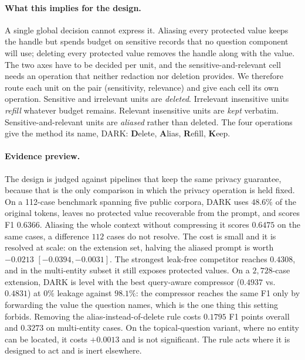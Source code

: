 \paragraph{What this implies for the design.}
A single global decision cannot express it. Aliasing every protected value keeps the handle
but spends budget on sensitive records that no question component will use; deleting every
protected value removes the handle along with the value. The two axes have to be decided per
unit, and the sensitive-and-relevant cell needs an operation that neither redaction nor
deletion provides. We therefore route each unit on the pair (sensitivity, relevance) and give
each cell its own operation. Sensitive and irrelevant units are \emph{deleted}. Irrelevant
insensitive units \emph{refill} whatever budget remains. Relevant insensitive units are
\emph{kept} verbatim. Sensitive-and-relevant units are \emph{aliased} rather than deleted.
The four operations give the method its name, \textsc{DARK}: \textbf{D}elete,
\textbf{A}lias, \textbf{R}efill, \textbf{K}eep.

\paragraph{Evidence preview.}
The design is judged against pipelines that keep the same privacy guarantee, because that is
the only comparison in which the privacy operation is held fixed. On a 112-case benchmark
spanning five public corpora, \textsc{DARK} uses $48.6\%$ of the original tokens, leaves no
protected value recoverable from the prompt, and scores F1 $0.6366$. Aliasing the whole
context without compressing it scores $0.6475$ on the same cases, a difference $112$ cases do not
resolve. The cost is small and it is resolved at scale: on the extension set, halving the aliased
prompt is worth $-0.0213$ $[-0.0394,-0.0031]$. The
strongest leak-free competitor reaches $0.4308$, and in the multi-entity subset it still
exposes protected values. On a $2{,}728$-case extension, \textsc{DARK} is level with the best
query-aware compressor ($0.4937$ vs.\ $0.4831$) at $0\%$ leakage against $98.1\%$: the
compressor reaches the same F1 only by forwarding the value the question names, which is the
one thing this setting forbids. Removing the alias-instead-of-delete rule costs $0.1795$ F1
points overall and $0.3273$ on multi-entity cases. On the topical-question variant, where no
entity can be located, it costs $+0.0013$ and is not significant. The rule acts where it is
designed to act and is inert elsewhere.

